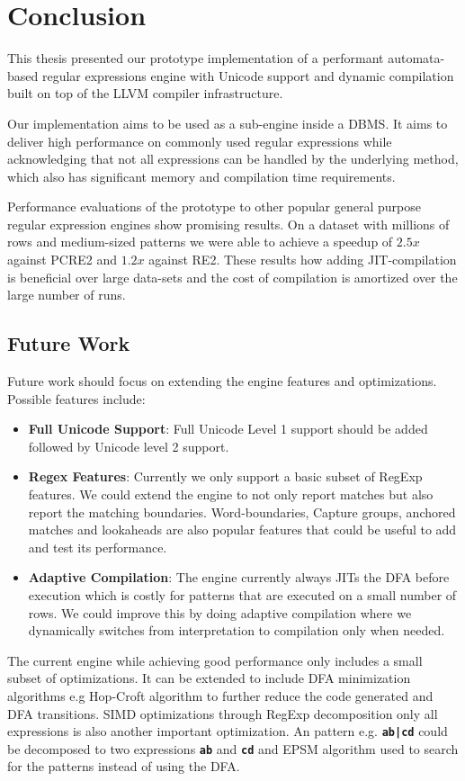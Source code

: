 \chapter{Conclusion}\label{chapter:conclusion}
This thesis presented our prototype implementation of a performant automata-based regular expressions engine with Unicode support and dynamic compilation built on top of the LLVM compiler infrastructure.

Our implementation aims to be used as a sub-engine inside a DBMS. It aims to deliver high performance on commonly used regular expressions while acknowledging that not all expressions can be handled by the underlying method, which also has significant memory and compilation time requirements.

Performance evaluations of the prototype to other popular general purpose regular expression engines show promising results. On a dataset with millions of rows and medium-sized patterns we were able to achieve a speedup of $2.5x$ against PCRE2 and $1.2x$ against RE2. These results how adding JIT-compilation is beneficial over large data-sets and the cost of compilation is amortized over the large number
of runs.

\section{Future Work}\label{futurework}

Future work should focus on extending the engine features and optimizations. Possible features include:
\begin{itemize}
    \item \textbf{Full Unicode Support}: Full Unicode Level 1 support should be added followed by Unicode level 2 support.
    \item \textbf{Regex Features}: Currently we only support a basic subset of RegExp features. We could extend the engine to not only report matches but also report the matching boundaries. Word-boundaries, Capture groups, anchored matches and lookaheads are also popular features that could be useful to add and test its performance.  
    \item \textbf{Adaptive Compilation}: The engine currently always JITs the DFA before execution which is costly for patterns that are executed on a small number of rows. We could improve this by doing adaptive compilation where we dynamically switches from interpretation to compilation only when needed.
\end{itemize}

The current engine while achieving good performance only includes a small subset of optimizations. It can be extended to include  DFA minimization algorithms e.g Hop-Croft algorithm to further reduce the code generated and DFA transitions. SIMD optimizations through RegExp decomposition only all expressions is also another important optimization. An pattern e.g. \texttt{\textbf{ab|cd}} could be decomposed to two expressions \texttt{\textbf{ab}} and \texttt{\textbf{cd}} and EPSM algorithm used to search for the patterns instead of using the DFA.